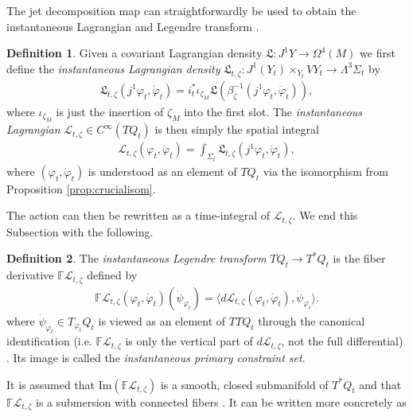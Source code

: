 \documentclass{article}
\theoremstyle{definition}
\newtheorem{definition}{Definition}[section]
\begin{document}
The jet decomposition map can straightforwardly be used to obtain the instantaneous Lagrangian and Legendre transform \cite{gotayMomentumMapsClassical2004a}.

\begin{definition}\label{def:instlagran}
    Given a covariant Lagrangian density $\mathfrak{L}\colon J^1Y\to \Omega^4(M)$ we first define the \textit{instantaneous Lagrangian density} $\mathfrak L_{t,\zeta}\colon
J^1(Y_t)\times_{Y_t}VY_t
\longrightarrow
\Lambda^3\Sigma_t$ by
    \begin{align*}
        \mathfrak L_{t,\zeta}(j^1\varphi_t,\dot\varphi_t)=
i_t^*\iota_{\zeta_M}
\mathfrak L\left(\beta_\zeta^{-1}
(j^1\varphi_t,\dot\varphi_t)\right),
    \end{align*}
    where $\iota_{\zeta_M}$ is just the insertion of $\zeta_M$ into the first slot. The \textit{instantaneous Lagrangian} $\mathcal{L}_{t,\zeta}\in C^\infty(TQ_t)$ is then simply the spatial integral
    \begin{align*}
        \mathcal{L}_{t,\zeta}(\varphi_t,\dot{\varphi}_t)=\int_{\Sigma_t}\mathfrak{L}_{t,\zeta}(j^1\varphi_t,\dot{\varphi}_t),
    \end{align*}
    where $(\varphi_t,\dot{\varphi}_t)$ is understood as an element of $TQ_t$ via the isomorphism from Proposition \ref{prop:crucialisom}.
\end{definition}
The action can then be rewritten as a time-integral of $\mathcal{L}_{t,\zeta}$. We end this Subsection with the following.
\begin{definition}\label{def:instlegendre}
    The \textit{instantaneous Legendre transform} $TQ_t\to T^*Q_t$ is the fiber derivative $\mathbb{F}\mathcal{L}_{t,\zeta}$ defined by
    \begin{align*}
        \mathbb{F}\mathcal{L}_{t,\zeta}(\varphi_t,\dot{\varphi}_t)(\dot{\psi}_{\varphi_t})=\langle d\mathcal{L}_{t,\zeta}(\varphi_t,\dot{\varphi}_t),\dot{\psi}_{\varphi_t}\rangle.
    \end{align*}
    where $\dot{\psi}_{\varphi_t}\in T_{\varphi_t}Q_t$ is viewed as an element of $TTQ_t$ through the canonical identification (i.e. $\mathbb{F}\mathcal{L}_{t,\zeta}$ is only the vertical part of $d\mathcal{L}_{t,\zeta}$, not the full differential) \cite{binz}. Its image is called the \textit{instantaneous primary constraint set}.
\end{definition}
It is assumed that $\text{Im}(\mathbb{F}\mathcal{L}_{t,\zeta})$ is a smooth, closed submanifold of $T^*Q_t$ and that $\mathbb{F}\mathcal{L}_{t,\zeta}$ is a submersion with connected fibers \cite{gotayMomentumMapsClassical2004a}. It can be written more concretely as
\end{document}
